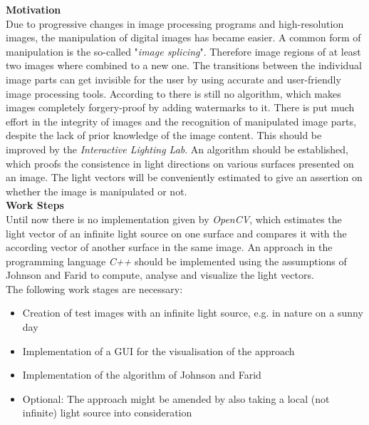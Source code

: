 \textbf{Motivation} \\
Due to progressive changes in image processing programs and high-resolution images, the manipulation of digital images has became easier. A common form of manipulation is the so-called "\textit{image splicing}". Therefore image regions of at least two images where combined to a new one. The transitions between the individual image parts can get invisible for the user by using accurate and user-friendly image processing tools.
According to \cite{Hsu2006DetectingIS} there is still no algorithm, which makes images completely forgery-proof by adding watermarks to it. There is put much effort in the integrity of images and the recognition of manipulated image parts, despite the lack of prior knowledge of the image content. This should be improved by the \textit{Interactive Lighting Lab}. An algorithm should be established, which proofs the consistence in light directions on various surfaces presented on an image. The light vectors will be conveniently estimated to give an assertion on whether the image is manipulated or not.\\

\textbf{Work Steps} \\
Until now there is no implementation given by \textit{OpenCV}, which estimates the light vector of an infinite light source on one surface and compares it with the according vector of another surface in the same image. An approach in the programming language \textit{C++} should be implemented using the assumptions of Johnson and Farid \cite{Johnson} to compute, analyse and visualize the light vectors. \\The following work stages are necessary: 

\begin{itemize}
\item Creation of test images with an infinite light source, e.g. in nature on a sunny day 
\item Implementation of a GUI for the visualisation of the approach
\item Implementation of the algorithm of Johnson and Farid \cite{Johnson}
\item Optional: The approach might be amended by also taking a local (not infinite) light source into consideration \cite{Johnson}
\end{itemize}


